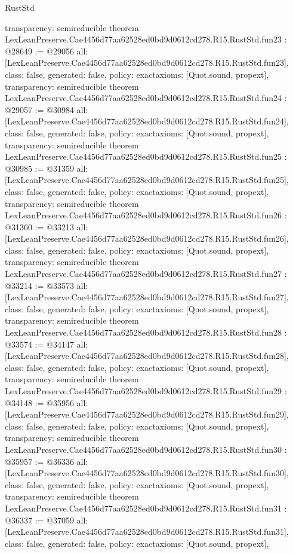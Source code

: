 \begin{lexlean}{RustStd}
\begin{coremodule}
{  transparency: semireducible
}
theorem LexLeanPreserve.Cae4456d77aa62528ed0bd9d0612cd278.R15.RustStd.fun23 : @28649 := @29056 {
  all: [LexLeanPreserve.Cae4456d77aa62528ed0bd9d0612cd278.R15.RustStd.fun23],
  class: false,
  generated: false,
  policy: exact{axioms: [Quot.sound, propext]},
  transparency: semireducible
}
theorem LexLeanPreserve.Cae4456d77aa62528ed0bd9d0612cd278.R15.RustStd.fun24 : @29057 := @30984 {
  all: [LexLeanPreserve.Cae4456d77aa62528ed0bd9d0612cd278.R15.RustStd.fun24],
  class: false,
  generated: false,
  policy: exact{axioms: [Quot.sound, propext]},
  transparency: semireducible
}
theorem LexLeanPreserve.Cae4456d77aa62528ed0bd9d0612cd278.R15.RustStd.fun25 : @30985 := @31359 {
  all: [LexLeanPreserve.Cae4456d77aa62528ed0bd9d0612cd278.R15.RustStd.fun25],
  class: false,
  generated: false,
  policy: exact{axioms: [Quot.sound, propext]},
  transparency: semireducible
}
theorem LexLeanPreserve.Cae4456d77aa62528ed0bd9d0612cd278.R15.RustStd.fun26 : @31360 := @33213 {
  all: [LexLeanPreserve.Cae4456d77aa62528ed0bd9d0612cd278.R15.RustStd.fun26],
  class: false,
  generated: false,
  policy: exact{axioms: [Quot.sound, propext]},
  transparency: semireducible
}
theorem LexLeanPreserve.Cae4456d77aa62528ed0bd9d0612cd278.R15.RustStd.fun27 : @33214 := @33573 {
  all: [LexLeanPreserve.Cae4456d77aa62528ed0bd9d0612cd278.R15.RustStd.fun27],
  class: false,
  generated: false,
  policy: exact{axioms: [Quot.sound, propext]},
  transparency: semireducible
}
theorem LexLeanPreserve.Cae4456d77aa62528ed0bd9d0612cd278.R15.RustStd.fun28 : @33574 := @34147 {
  all: [LexLeanPreserve.Cae4456d77aa62528ed0bd9d0612cd278.R15.RustStd.fun28],
  class: false,
  generated: false,
  policy: exact{axioms: [Quot.sound, propext]},
  transparency: semireducible
}
theorem LexLeanPreserve.Cae4456d77aa62528ed0bd9d0612cd278.R15.RustStd.fun29 : @34148 := @35956 {
  all: [LexLeanPreserve.Cae4456d77aa62528ed0bd9d0612cd278.R15.RustStd.fun29],
  class: false,
  generated: false,
  policy: exact{axioms: [Quot.sound, propext]},
  transparency: semireducible
}
theorem LexLeanPreserve.Cae4456d77aa62528ed0bd9d0612cd278.R15.RustStd.fun30 : @35957 := @36336 {
  all: [LexLeanPreserve.Cae4456d77aa62528ed0bd9d0612cd278.R15.RustStd.fun30],
  class: false,
  generated: false,
  policy: exact{axioms: [Quot.sound, propext]},
  transparency: semireducible
}
theorem LexLeanPreserve.Cae4456d77aa62528ed0bd9d0612cd278.R15.RustStd.fun31 : @36337 := @37059 {
  all: [LexLeanPreserve.Cae4456d77aa62528ed0bd9d0612cd278.R15.RustStd.fun31],
  class: false,
  generated: false,
  policy: exact{axioms: [Quot.sound, propext]},
}
\end{coremodule}
\end{lexlean}
